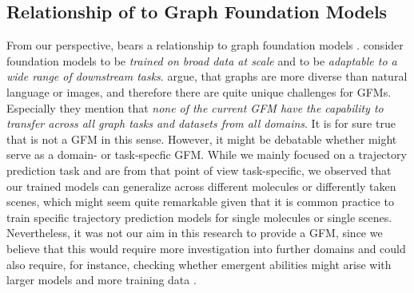 \subsection{Relationship of \ourMethod to Graph Foundation Models}
From our perspective, \ourMethod bears a relationship to graph foundation models \citep[GFMs;][]{liu2023towards,maoposition}. \citet{bommasani2021opportunities} consider foundation models to be \textit{trained on broad data at scale} and to be \textit{adaptable to a wide range of downstream tasks}. \citet{maoposition} argue, that graphs are more diverse than natural language or images, and therefore there are quite unique challenges for GFMs. Especially they mention that \textit{ none of the current GFM have the capability to transfer across all graph tasks and datasets from all domains}. It is for sure true that \ourMethod is not a GFM in this sense. However, it might be debatable whether \ourMethod might serve as a domain- or task-specfic GFM. While we mainly focused on a trajectory prediction task and are from that point of view task-specific, we observed that our trained models can generalize across different molecules or differently taken scenes, which might seem quite remarkable given that it is common practice to train specific trajectory prediction models for single molecules or single scenes. Nevertheless, it was not our aim in this research to provide a GFM, since we believe that this would require more investigation into further domains and could also require, for instance, checking whether emergent abilities might arise with larger models and more training data \citep{liu2023towards}.









\clearpage